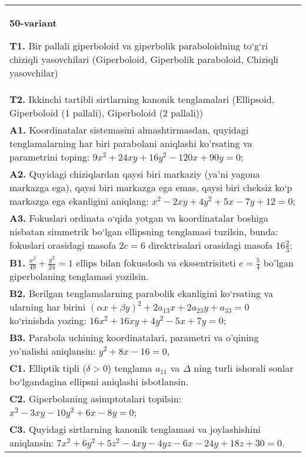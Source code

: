 \documentclass{article}
\begin{document}
\begin{tabular}{m{17cm}}
\textbf{50-variant}
\newline

\textbf{T1.} Bir pallali giperboloid va giperbolik paraboloidning to‘g‘ri chiziqli yasovchilari (Giperboloid, Giperbolik paraboloid, Chiziqli yasovchilar) \\
\textbf{T2.} Ikkinchi tartibli sirtlarning kanonik tenglamalari (Ellipsoid, Giperboloid (1 pallali), Giperboloid (2 pallali)) \\
\textbf{A1.} Koordinatalar sistemasini almashtirmasdan, quyidagi tenglamalarning har biri parabolani aniqlashi ko'rsating va parametrini toping: $9 x^2+24 x y+16 y^2-120 x+90 y=0$; \\
\textbf{A2.} Quyidagi chiziqlardan qaysi biri markaziy (ya’ni yagona markazga ega), qaysi biri markazga ega emas, qaysi biri cheksiz ko‘p markazga ega ekanligini aniqlang: $x^2-2 x y+4 y^2+5 x-7 y+12=0$; \\
\textbf{A3.} Fokuslari ordinata o‘qida yotgan va koordinatalar boshiga nisbatan simmetrik bo‘lgan ellipsning tenglamasi tuzilsin, bunda: fokuslari orasidagi masofa $2 c=6$ direktrisalari orasidagi masofa $16 \frac{2}{3}$; \\
\textbf{B1.} $\frac{x^2}{49}+\frac{y^2}{24}=1$ ellips bilan fokusdosh va ekssentrisiteti $e=\frac{5}{4}$ bo'lgan giperbolaning tenglamasi yozilsin. \\
\textbf{B2.} Berilgan tenglamalarning parabolik ekanligini ko‘rsating va ularning har birini $(\alpha x+\beta y)^2+2 a_{13} x+2 a_{23} y+a_{33}=0$ ko‘rinishda yozing: $16 x^2+16 x y+4 y^2-5 x+7 y=0$; \\
\textbf{B3.} Parabola uchining koordinatalari, parametri va o'qining yo'nalishi aniqlansin: $y^2+8 x-16=0$, \\
\textbf{C1.} Elliptik tipli ($\delta>0$) tenglama $a_{11}$ va $\Delta$ ning turli ishorali sonlar bo‘lgandagina ellipsni aniqlashi isbotlansin. \\
\textbf{C2.} Giperbolaning asimptotalari topilsin: $x^2-3 x y-10 y^2+6 x-8 y=0$; \\
\textbf{C3.} Quyidagi sirtlarning kanonik tenglamasi va joylashishini aniqlansin: $7 x^2+6 y^2+5 z^2-4 x y-4 y z-6 x-24 y+18 z+30=0$. \\

\end{tabular}
\vspace{1cm}
\end{document}

